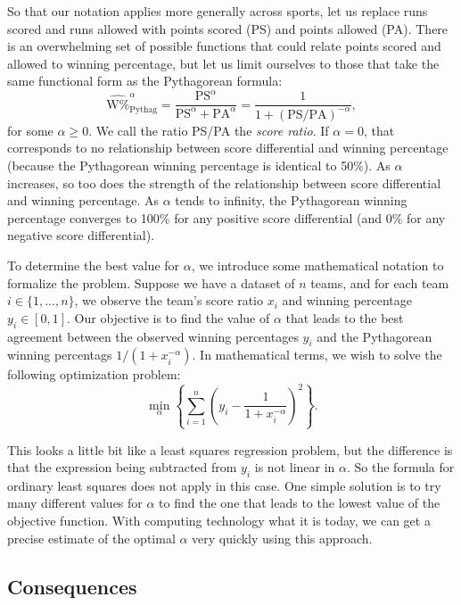 \documentclass{article}
\begin{document}
    So that our notation applies more generally across sports, let us replace runs scored and runs allowed with points scored (PS) and points allowed (PA). There is an overwhelming set of possible functions that could relate points scored and allowed to winning percentage, but let us limit ourselves to those that take the same functional form as the Pythagorean formula:
    $$
      \hat{\mbox{W\%}}_{\mbox{Pythag}}^\alpha = \frac{\mbox{PS}^\alpha}{\mbox{PS}^\alpha + \mbox{PA}^\alpha} = \frac{1}{1 + (\mbox{PS/PA})^{-\alpha}},
    $$
    for some $\alpha \ge 0$. We call the ratio PS/PA the {\it score ratio}. If $\alpha = 0$, that corresponds to no relationship between score differential and winning percentage (because the Pythagorean winning percentage is identical to 50\%). As $\alpha$ increases, so too does the strength of the relationship between score differential and winning percentage. As $\alpha$ tends to infinity, the Pythagorean winning percentage converges to 100\% for any positive score differential (and 0\% for any negative score differential).
    
    To determine the best value for $\alpha$, we introduce some mathematical notation to formalize the problem. Suppose we have a dataset of $n$ teams, and for each team $i \in \{1, ..., n\}$, we observe the team's score ratio $x_i$ and winning percentage $y_i \in [0, 1]$. Our objective is to find the value of $\alpha$ that leads to the best agreement between the observed winning percentages $y_i$ and the Pythagorean winning percentags $1 / (1 + x_i^{-\alpha})$. In mathematical terms, we wish to solve the following optimization problem:
    \begin{equation*}
      \min_\alpha \left\{\sum_{i = 1}^n \left(y_i - \frac{1}{1 + x_i^{-\alpha}}\right)^2 \right\}.
    \end{equation*}
    
    This looks a little bit like a least squares regression problem, but the difference is that the expression being subtracted from $y_i$ is not linear in $\alpha$. So the formula for ordinary least squares does not apply in this case. One simple solution is to try many different values for $\alpha$ to find the one that leads to the lowest value of the objective function. With computing technology what it is today, we can get a precise estimate of the optimal $\alpha$ very quickly using this approach.
    
    \subsection{\sc Consequences}
    
\end{document}
